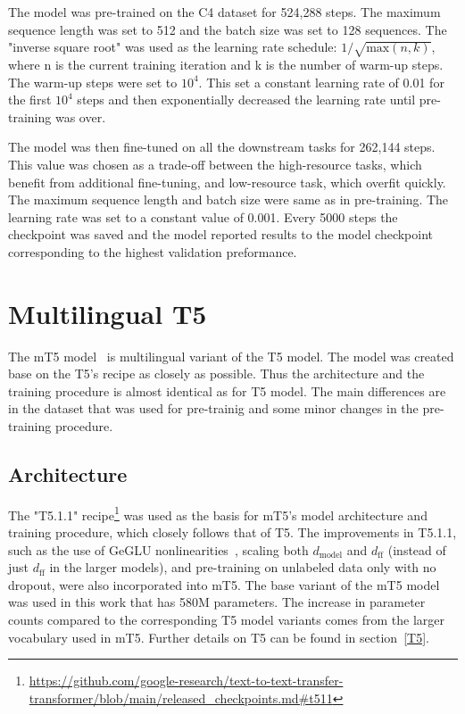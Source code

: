 The model was pre-trained on the C4 dataset for 524,288 steps. The maximum sequence length was set to 512 and the batch size was set to 128 sequences. The "inverse square root" was used as the learning rate schedule: $1/\sqrt{\text{max}(n,k)}$, where n is the current training iteration and k is the number of warm-up steps. The warm-up steps were set to $10^4$. This set a constant learning rate of 0.01 for the first $10^4$ steps and then exponentially decreased the learning rate until pre-training was over.

The model was then fine-tuned on all the downstream tasks for 262,144 steps. This value was chosen as a trade-off between the high-resource tasks, which benefit from additional fine-tuning, and low-resource task, which overfit quickly. The maximum sequence length and batch size were same as in pre-training. The learning rate was set to a constant value of 0.001. Every 5000 steps the checkpoint was saved and the model reported results to the model checkpoint corresponding to the highest validation preformance.

\section{Multilingual T5}
The mT5 model~\cite{mt5} is multilingual variant of the T5 model. The model was created base on the T5's recipe as closely as possible. Thus the architecture and the training procedure is almost identical as for T5 model. The main differences are in the dataset that was used for pre-trainig and some minor changes in the pre-training procedure.

\subsection*{Architecture}
The "T5.1.1" recipe\footnote{\url{https://github.com/google-research/text-to-text-transfer-transformer/blob/main/released_checkpoints.md\#t511}} was used as the basis for mT5's model architecture and training procedure, which closely follows that of T5. The improvements in T5.1.1, such as the use of GeGLU nonlinearities~\cite{glu}, scaling both $d_{\text{model}}$ and $d_{\text{ff}}$ (instead of just $d_{\text{ff}}$ in the larger models), and pre-training on unlabeled data only with no dropout, were also incorporated into mT5. The base variant of the mT5 model was used in this work that has 580M parameters. The increase in parameter counts compared to the corresponding T5 model variants comes from the larger vocabulary used in mT5. Further details on T5 can be found in section~\ref{T5}.

